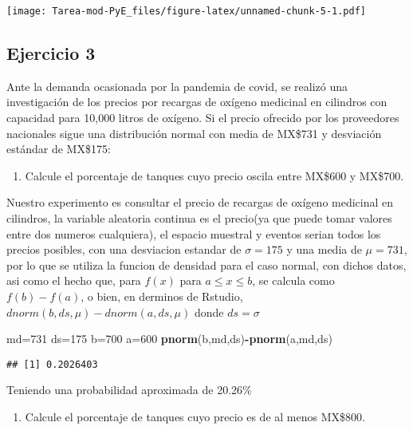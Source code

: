 \documentclass[
]{article}
\newenvironment{Shaded}{\begin{snugshade}}{\end{snugshade}}
\newcommand{\DecValTok}[1]{\textcolor[rgb]{0.00,0.00,0.81}{#1}}
\newcommand{\FunctionTok}[1]{\textcolor[rgb]{0.13,0.29,0.53}{\textbf{#1}}}
\newcommand{\NormalTok}[1]{#1}
\newcommand{\OtherTok}[1]{\textcolor[rgb]{0.56,0.35,0.01}{#1}}
\newcommand{\SpecialCharTok}[1]{\textcolor[rgb]{0.81,0.36,0.00}{\textbf{#1}}}
\providecommand{\tightlist}{%
  \setlength{\itemsep}{0pt}\setlength{\parskip}{0pt}}
\begin{document}
\texttt{[image: Tarea-mod-PyE\_files/figure-latex/unnamed-chunk-5-1.pdf]}

\subsection{Ejercicio 3}\label{ejercicio-3}

Ante la demanda ocasionada por la pandemia de covid, se realizó una
investigación de los precios por recargas de oxígeno medicinal en
cilindros con capacidad para 10,000 litros de oxígeno. Si el precio
ofrecido por los proveedores nacionales sigue una distribución normal
con media de MX\$731 y desviación estándar de MX\$175:

\begin{enumerate}
\def\labelenumi{\arabic{enumi}.}
\tightlist
\item
  Calcule el porcentaje de tanques cuyo precio oscila entre MX\$600 y
  MX\$700.
\end{enumerate}

Nuestro experimento es consultar el precio de recargas de oxígeno
medicinal en cilindros, la variable aleatoria continua es el precio(ya
que puede tomar valores entre dos numeros cualquiera), el espacio
muestral y eventos serian todos los precios posibles, con una desviacion
estandar de \(\sigma=175\) y una media de \(\mu=731\), por lo que se
utiliza la funcion de densidad para el caso normal, con dichos datos,
asi como el hecho que, para \(f(x)\) para \(a\leq x\leq b\), se calcula
como \(f(b)-f(a)\), o bien, en derminos de Rstudio,
\(dnorm(b,ds,\mu)-dnorm(a,ds,\mu)\) donde \(ds=\sigma\)

\begin{Shaded}
\begin{Highlighting}[]
\NormalTok{md}\OtherTok{=}\DecValTok{731}
\NormalTok{ds}\OtherTok{=}\DecValTok{175}
\NormalTok{b}\OtherTok{=}\DecValTok{700}
\NormalTok{a}\OtherTok{=}\DecValTok{600}
\FunctionTok{pnorm}\NormalTok{(b,md,ds)}\SpecialCharTok{{-}}\FunctionTok{pnorm}\NormalTok{(a,md,ds)}
\end{Highlighting}
\end{Shaded}

\begin{verbatim}
## [1] 0.2026403
\end{verbatim}

Teniendo una probabilidad aproximada de 20.26\%

\begin{enumerate}
\def\labelenumi{\arabic{enumi}.}
\setcounter{enumi}{1}
\tightlist
\item
  Calcule el porcentaje de tanques cuyo precio es de al menos MX\$800.
\end{enumerate}
\end{document}
